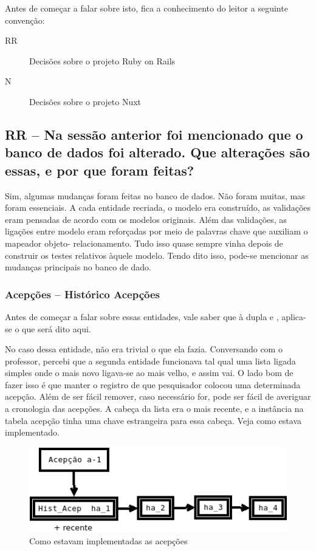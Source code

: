 Antes de começar a falar sobre isto, fica a conhecimento do leitor a seguinte convenção:
\begin{description}
    \item[RR] Decisões sobre o projeto Ruby on Rails
    \item[N] Decisões sobre o projeto Nuxt
\end{description}

\subsection{RR -- Na sessão anterior foi mencionado que o banco de dados foi alterado. Que alterações são essas, e por que
foram feitas?} \label{subsec:db-changes}

Sim, algumas mudanças foram feitas no banco de dados. Não foram muitas, mas foram essenciais. A cada entidade
recriada, o modelo era construído, as validações eram pensadas de acordo com os modelos originais. Além das
validações, as ligações entre modelo eram reforçadas por meio de palavras chave que auxiliam o mapeador objeto-
relacionamento. Tudo isso quase sempre vinha depois de construir os testes relativos àquele modelo. Tendo dito
isso, pode-se mencionar as mudanças principais no banco de dado.

\subsubsection{Acepções -- Histórico Acepções}

Antes de começar a falar sobre essas entidades, vale saber que à dupla  e ,
aplica-se o que será dito aqui.

No caso dessa entidade, não era trivial o que ela fazia. Conversando com o professor, percebi que a segunda
entidade funcionava tal qual uma lista ligada simples onde o mais novo ligava-se ao mais velho, e assim vai.
O lado bom de fazer isso é que manter o registro de que pesquisador colocou uma determinada acepção. Além de
ser fácil remover, caso necessário for, pode ser fácil de averiguar a cronologia das acepções. A cabeça da lista
era o mais recente, e a instância na tabela acepção tinha uma chave estrangeira para essa cabeça. Veja como
estava implementado.

\begin{figure}[htb]
    \centering
    \includegraphics[width=.6\textwidth]{figuras/acep.png}
    \caption{Como estavam implementadas as acepções}
    \label{fig:acep}
\end{figure}

